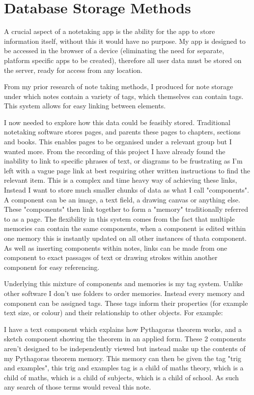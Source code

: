 \section{Database Storage Methods}
\label{research:DatabaseStorageMethods}
A crucial aspect of a notetaking app is the ability for the app to store information itself, without this it would have no purpose. My app is designed to be accessed in the browser of a device (eliminating the need for separate, platform specific apps to be created), therefore all user data must be stored on the server, ready for access from any location.


From my prior research of note taking methods, I produced  for note storage under which notes contain a variety of tags, which themselves can contain tags. This system allows for easy linking between elements. 

I now needed to explore how this data could be feasibly stored. Traditional notetaking software stores pages, and parents these pages to chapters, sections and books. This enables pages to be organised under a relevant group but I wanted more. From the recording of this project I have already found the inability to link to specific phrases of text, or diagrams to be frustrating as I'm left with a vague page link at best requiring other written instructions to find the relevant item. This is a complex and time heavy way of achieving these links, Instead I want to store much smaller chunks of data as what I call "components". A component can be an image, a text field, a drawing canvas or anything else. These "components" then link together to form a "memory" traditionally referred to as a page. The flexibility in this system comes from the fact that multiple memories can contain the same components, when a component is edited within one memory this is instantly updated on all other instances of thata component. As well as inserting components within notes, links can be made from one component to exact passages of text or drawing strokes within another component for easy referencing.

Underlying this mixture of components and memories is my tag system. Unlike other software I don't use folders to order memories. Instead every memory and component can be assigned tags. These tags inform their properties (for example text size, or colour) and their relationship to other objects. For example: 

I have a text component which explains how Pythagoras theorem works, and a sketch component showing the theorem in an applied form. These 2 components aren't designed to be independently viewed but instead make up the contents of my Pythagoras theorem memory. This memory can then be given the tag "trig and examples", this trig and examples tag is a child of maths theory, which is a child of maths, which is a child of subjects, which is a child of school. As such any search of those terms would reveal this note.

